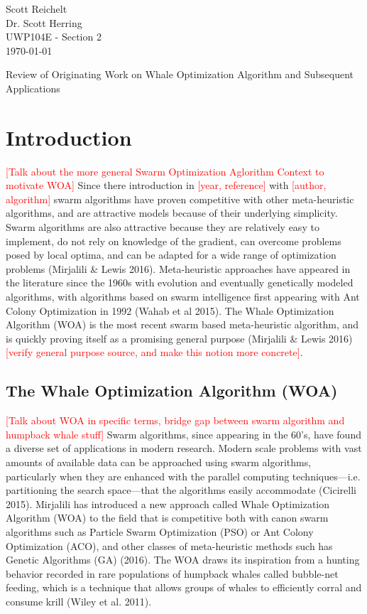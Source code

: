 \documentclass[11pt]{article}
\newcommand{\TODO}[1]{\textcolor{red}{[#1]}}
\begin{document}
    \thispagestyle{empty}
    \begin{flushleft}
        Scott Reichelt\\
        Dr. Scott Herring\\
        UWP104E - Section 2\\
        \today\\
    \end{flushleft}
    \vspace{1em}
    \begin{center}
        Review of Originating Work on Whale Optimization Algorithm and Subsequent Applications
    \end{center}

\section*{Introduction}
\TODO{Talk about the more general Swarm Optimization Aglorithm Context to motivate WOA}
Since there introduction in \TODO{year, reference} with \TODO{author, algorithm} swarm algorithms have proven competitive with other meta-heuristic algorithms, and are attractive models because of their underlying simplicity.
Swarm algorithms are also attractive because they are relatively easy to implement, do not rely on knowledge of the gradient, can overcome problems posed by local optima, and can be adapted for a wide range of optimization problems (Mirjalili \& Lewis 2016).
Meta-heuristic approaches have appeared in the literature since the 1960s with evolution and eventually genetically modeled algorithms, with algorithms based on swarm intelligence first appearing with Ant Colony Optimization in 1992 (Wahab et al 2015).
The Whale Optimization Algorithm (WOA) is the most recent swarm based meta-heuristic algorithm, and is quickly proving itself as a promising general purpose (Mirjalili \& Lewis 2016) \TODO{verify general purpose source, and make this notion more concrete}.

\subsection*{The Whale Optimization Algorithm (WOA)}
\TODO{Talk about WOA in specific terms, bridge gap between swarm algorithm and humpback whale stuff}
Swarm algorithms, since appearing in the 60's, have found a diverse set of applications in modern research.
Modern scale problems with vast amounts of available data can be approached using swarm algorithms, particularly when they are enhanced with the parallel computing techniques---i.e. partitioning the search space---that the algorithms easily accommodate (Cicirelli 2015).
Mirjalili has introduced a new approach called Whale Optimization Algorithm (WOA) to the field that is competitive both with canon swarm algorithms such as Particle Swarm Optimization (PSO) or Ant Colony Optimization (ACO), and other classes of meta-heuristic methods such has Genetic Algorithms (GA) (2016).
The WOA draws its inspiration from a hunting behavior recorded in rare populations of humpback whales called bubble-net feeding, which is a technique that allows groups of whales to efficiently corral and consume krill (Wiley et al. 2011).
\end{document}

